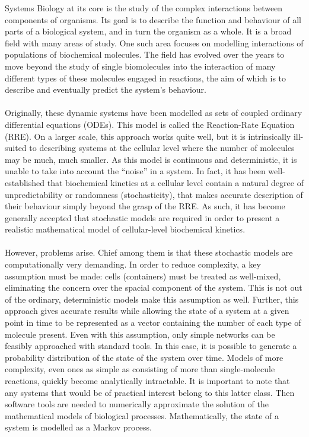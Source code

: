 \documentclass[ugrad,lot,lof,openright,11pt,oneside,onehalfspace]{RUthesis}
\begin{document}
		Systems Biology at its core is the study of the complex interactions between components of organisms. Its goal is to describe the function and behaviour of all parts of a biological system, and in turn the organism as a whole. It is a broad field with many areas of study. One such area focuses on modelling interactions of populations of biochemical molecules. The field has evolved over the years to move beyond the study of single biomolecules into the interaction of many different types of these molecules engaged in reactions, the aim of which is to describe and eventually predict the system's behaviour.\\
		\\
		Originally, these dynamic systems have been modelled as sets of coupled ordinary differential equations (ODEs). This model is called the Reaction-Rate Equation (RRE). On a larger scale, this approach works quite well, but it is intrinsically ill-suited to describing systems at the cellular level where the number of molecules may be much, much smaller. As this model is continuous and deterministic, it is unable to take into account the ``noise'' in a system. In fact, it has been well-established that biochemical kinetics at a cellular level contain a natural degree of unpredictability or randomness (stochasticity), that makes accurate description of their behaviour simply beyond the grasp of the RRE. As such, it has become generally accepted that stochastic models are required in order to present a realistic mathematical model of cellular-level biochemical kinetics.\\
		\\
		However, problems arise. Chief among them is that these stochastic models are computationally very demanding. In order to reduce complexity, a key assumption must be made: cells (containers) must be treated as well-mixed, eliminating the concern over the spacial component of the system. This is not out of the ordinary, deterministic models make this assumption as well. Further, this approach gives accurate results while allowing the state of a system at a given point in time to be represented as a vector containing the number of each type of molecule present. Even with this assumption, only simple networks can be feasibly approached with standard tools. In this case, it is possible to generate a probability distribution of the state of the system over time. Models of more complexity, even ones as simple as consisting of more than single-molecule reactions, quickly become analytically intractable. It is important to note that any systems that would be of practical interest belong to this latter class. Then software tools are needed to numerically approximate the solution of the mathematical models of biological processes. Mathematically, the state of a system is modelled as a Markov process.
\end{document}
